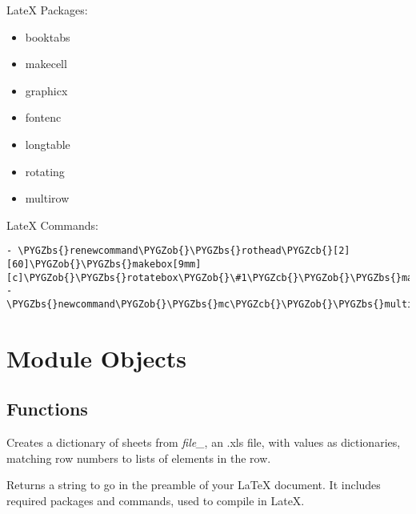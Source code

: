 \documentclass[letterpaper,10pt,english]{sphinxmanual}
\def\PYGZbs{\char`\\}
\def\PYGZob{\char`\{}
\def\PYGZcb{\char`\}}
\begin{document}
LateX Packages:
\begin{itemize}
\item {} 
booktabs

\item {} 
makecell

\item {} 
graphicx

\item {} 
fontenc

\item {} 
longtable

\item {} 
rotating

\item {} 
multirow

\end{itemize}

LateX Commands:

\begin{Verbatim}[commandchars=\\\{\}]
- \PYGZbs{}renewcommand\PYGZob{}\PYGZbs{}rothead\PYGZcb{}[2][60]\PYGZob{}\PYGZbs{}makebox[9mm][c]\PYGZob{}\PYGZbs{}rotatebox\PYGZob{}\#1\PYGZcb{}\PYGZob{}\PYGZbs{}makecell[c]\PYGZob{}\#2\PYGZcb{}\PYGZcb{}\PYGZcb{}\PYGZcb{}
- \PYGZbs{}newcommand\PYGZob{}\PYGZbs{}mc\PYGZcb{}\PYGZob{}\PYGZbs{}multicolumn\PYGZcb{}
\end{Verbatim}


\chapter{Module Objects}
\label{summary:module-objects}

\section{Functions}
\label{summary:functions}

\begin{fulllineitems}
\label{summary:tablemaker.read}
Creates a dictionary of sheets from \emph{file\_}, an .xls file, 
with values as dictionaries, matching row numbers to lists of 
elements in the row.

\end{fulllineitems}


\begin{fulllineitems}
\label{summary:tablemaker.texCommands}
Returns a string to go in the preamble of your LaTeX
document. It includes required packages and commands, 
used to compile in LateX.

\end{fulllineitems}
\end{document}
